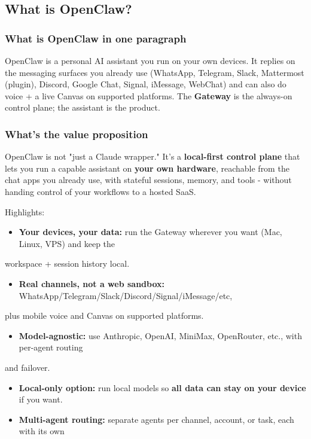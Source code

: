\subsection{What is OpenClaw?}


\subsubsection{What is OpenClaw in one paragraph}


OpenClaw is a personal AI assistant you run on your own devices. It replies on the messaging surfaces you already use (WhatsApp, Telegram, Slack, Mattermost (plugin), Discord, Google Chat, Signal, iMessage, WebChat) and can also do voice + a live Canvas on supported platforms. The \textbf{Gateway} is the always-on control plane; the assistant is the product.

\subsubsection{What's the value proposition}


OpenClaw is not "just a Claude wrapper." It's a \textbf{local-first control plane} that lets you run a
capable assistant on \textbf{your own hardware}, reachable from the chat apps you already use, with
stateful sessions, memory, and tools - without handing control of your workflows to a hosted
SaaS.

Highlights:

\begin{itemize}
  \item \textbf{Your devices, your data:} run the Gateway wherever you want (Mac, Linux, VPS) and keep the
\end{itemize}

workspace + session history local.
\begin{itemize}
  \item \textbf{Real channels, not a web sandbox:} WhatsApp/Telegram/Slack/Discord/Signal/iMessage/etc,
\end{itemize}

plus mobile voice and Canvas on supported platforms.
\begin{itemize}
  \item \textbf{Model-agnostic:} use Anthropic, OpenAI, MiniMax, OpenRouter, etc., with per-agent routing
\end{itemize}

and failover.
\begin{itemize}
  \item \textbf{Local-only option:} run local models so \textbf{all data can stay on your device} if you want.
  \item \textbf{Multi-agent routing:} separate agents per channel, account, or task, each with its own
\end{itemize}

